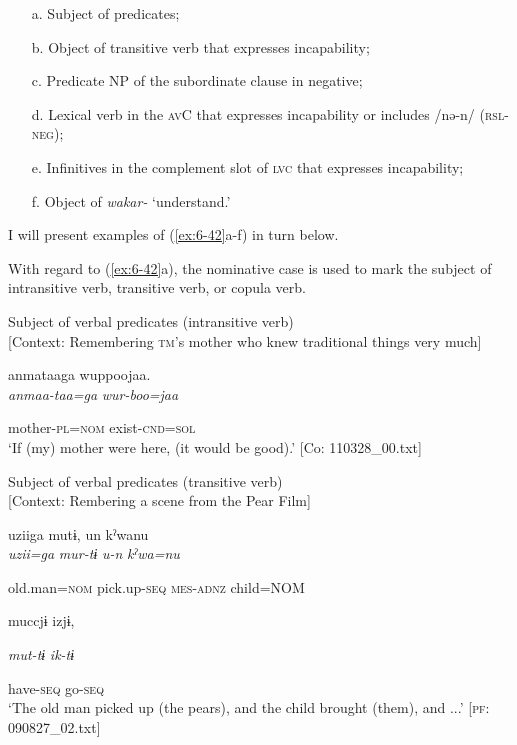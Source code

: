 \begin{table}
 \begin{itemize}
\item[a.]   Subject of predicates;
\item[b.] Object of transitive verb that expresses incapability;
\item[c.] Predicate NP of the subordinate clause in negative;
\item[d.] Lexical verb in the \textsc{av}C that expresses incapability or includes /nə-n/ (\textsc{rsl}-\textsc{neg});
\item[e.] Infinitives in the complement slot of \textsc{lvc} that expresses incapability;
\item[f.] Object of \textit{wakar-} ‘understand.’
\end{itemize}
I will present examples of (\ref{ex:6-42}a-f) in turn below.

With regard to (\ref{ex:6-42}a), the nominative case is used to mark the subject of intransitive verb, transitive verb, or copula verb.

\ea\label{ex:6-43}
\ea Subject of verbal predicates (intransitive verb)\\{}
[Context: Remembering \textsc{tm}’s mother who knew traditional things very much]

{\TM}
\glll anmataaga  wuppoojaa.\\

      \textit{anmaa-taa=ga}  \textit{wur-boo=jaa}

      mother-\textsc{pl}=\textsc{nom}  exist-\textsc{cnd}=\textsc{sol}\\
\glt ‘If (my) mother were here, (it would be good).’ [Co: 110328\_00.txt]
\z

\ex Subject of verbal predicates (transitive verb)\\{}
[Context: Rembering a scene from the Pear Film]

{\TM}
\glll uziiga  mutɨ,  un  kˀwanu\\

      \textit{uzii=ga}  \textit{mur-tɨ}  \textit{u-n}  \textit{kˀwa=nu}

      old.man=\textsc{nom}  pick.up-\textsc{seq}  \textsc{mes}-\textsc{adnz}  child=NOM

      muccjɨ  izjɨ,

      \textit{mut-tɨ}  \textit{ik-tɨ}

      have-\textsc{seq}  go-\textsc{seq}\\
\glt ‘The old man picked up (the pears), and the child brought (them), and ...’ [\textsc{pf}: 090827\_02.txt]
\z


\end{table}
